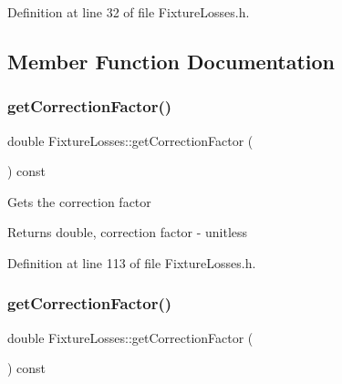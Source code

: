 Definition at line 32 of file Fixture\+Losses.\+h.



\subsection{Member Function Documentation}
\mbox{\label{class_fixture_losses_af643d715a8b1369efa586fa43e75c732}} 
\subsubsection{\texorpdfstring{get\+Correction\+Factor()}{getCorrectionFactor()}\hspace{0.1cm}{\footnotesize\ttfamily [1/3]}}
{\footnotesize\ttfamily double Fixture\+Losses\+::get\+Correction\+Factor (\begin{DoxyParamCaption}{ }\end{DoxyParamCaption}) const\hspace{0.3cm}{\ttfamily [inline]}}

Gets the correction factor \begin{DoxyReturn}{Returns}
double, correction factor -\/ unitless 
\end{DoxyReturn}


Definition at line 113 of file Fixture\+Losses.\+h.

\mbox{\label{class_fixture_losses_af643d715a8b1369efa586fa43e75c732}} 
\subsubsection{\texorpdfstring{get\+Correction\+Factor()}{getCorrectionFactor()}\hspace{0.1cm}{\footnotesize\ttfamily [2/3]}}
{\footnotesize\ttfamily double Fixture\+Losses\+::get\+Correction\+Factor (\begin{DoxyParamCaption}{ }\end{DoxyParamCaption}) const\hspace{0.3cm}{\ttfamily [inline]}}

